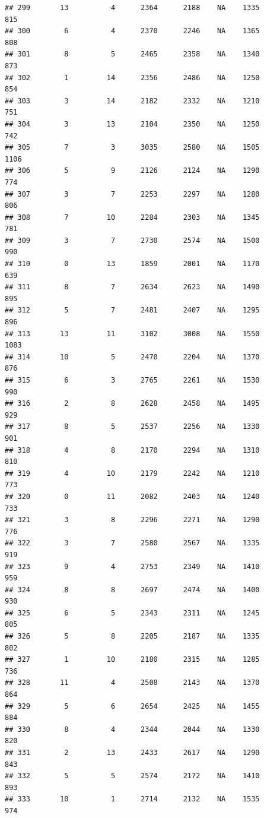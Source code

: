 \documentclass[]{book}
\begin{document}
\begin{verbatim}
## 299       13          4      2364      2188    NA    1335            815
## 300        6          4      2370      2246    NA    1365            808
## 301        8          5      2465      2358    NA    1340            873
## 302        1         14      2356      2486    NA    1250            854
## 303        3         14      2182      2332    NA    1210            751
## 304        3         13      2104      2350    NA    1250            742
## 305        7          3      3035      2580    NA    1505           1106
## 306        5          9      2126      2124    NA    1290            774
## 307        3          7      2253      2297    NA    1280            806
## 308        7         10      2284      2303    NA    1345            781
## 309        3          7      2730      2574    NA    1500            990
## 310        0         13      1859      2001    NA    1170            639
## 311        8          7      2634      2623    NA    1490            895
## 312        5          7      2481      2407    NA    1295            896
## 313       13         11      3102      3008    NA    1550           1083
## 314       10          5      2470      2204    NA    1370            876
## 315        6          3      2765      2261    NA    1530            990
## 316        2          8      2628      2458    NA    1495            929
## 317        8          5      2537      2256    NA    1330            901
## 318        4          8      2170      2294    NA    1310            810
## 319        4         10      2179      2242    NA    1210            773
## 320        0         11      2082      2403    NA    1240            733
## 321        3          8      2296      2271    NA    1290            776
## 322        3          7      2580      2567    NA    1335            919
## 323        9          4      2753      2349    NA    1410            959
## 324        8          8      2697      2474    NA    1400            930
## 325        6          5      2343      2311    NA    1245            805
## 326        5          8      2205      2187    NA    1335            802
## 327        1         10      2180      2315    NA    1285            736
## 328       11          4      2508      2143    NA    1370            864
## 329        5          6      2654      2425    NA    1455            884
## 330        8          4      2344      2044    NA    1330            820
## 331        2         13      2433      2617    NA    1290            843
## 332        5          5      2574      2172    NA    1410            893
## 333       10          1      2714      2132    NA    1535            974

\end{verbatim}
\end{document}
